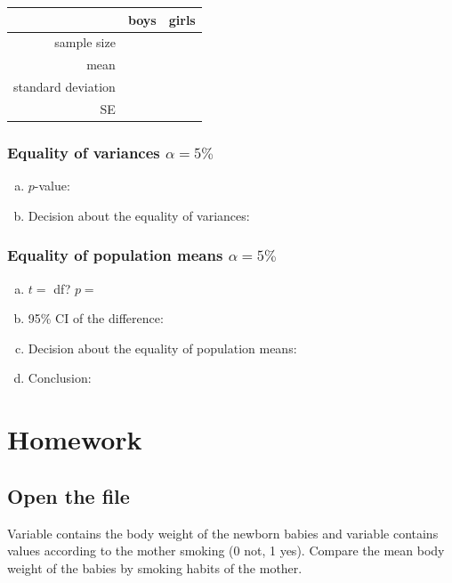 	
	\begin{center}
		\begin{tabular}{r|C{2cm}|C{2cm}}
		\toprule
					& boys & girls\\
		\midrule
		sample size	&&\\
		mean		&&\\
		standard deviation		&&\\
		SE			&&\\
		\bottomrule
		\end{tabular}
	\end{center}

\subsubsection*{Equality of variances $\alpha=5\%$}
		\begin{enumerate}[a)]
		\item $p$-value: \hrulefill	
		\item Decision about the equality of variances:	\hrulefill
		\end{enumerate}
		
\subsubsection*{Equality of population means $\alpha=5\%$}
		\begin{enumerate}[a)]
		\item $t=$ \hrulefill \quad df?	\hrulefill\quad			$p=$ \hrulefill
		\item 95\% CI of the difference: \hrulefill
		\item Decision about the equality of population means: \hrulefill
		\item Conclusion: \hrulefill		
		\end{enumerate}


\section{Homework}
\subsection[LWTBWT.csv]{Open the file } 
Variable  contains the body weight of the newborn babies and variable  contains values according to the mother smoking (0 not, 1 yes). Compare the mean body weight of the babies by smoking habits of the mother. 


